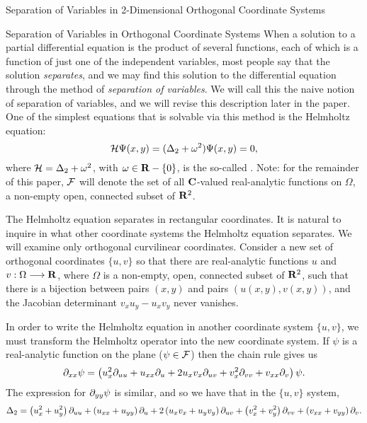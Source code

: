 \begin{center}
\LARGE Separation of Variables in 2-Dimensional Orthogonal Coordinate Systems \

\end{center}

\normalsize

\begin{section}{Separation of Variables in Orthogonal Coordinate Systems}
When a solution to a partial differential equation is the product of several functions, each of which is a function of just one of the independent variables, most people say that the solution \emph{separates}, and we may find this solution to the differential equation through the method of \emph{separation of variables}.  We will call this the naive notion of separation of variables, and we will revise this description later in the paper.  One of the simplest equations that is solvable via this method is the Helmholtz equation:
\begin{equation}
\label{helmholtz}
\mathcal{H} \Psi(x, y) = (\Delta_2 + \omega^2)\Psi(x, y) = 0,
\end{equation}
where $\mathcal{H} = \Delta_2 + \omega^2$, with $\omega \in \mathbf{R} - \{ 0 \}$, is the so-called .  Note: for the remainder of this paper, $\mathcal{F}$ will denote the set of all $\mathbf{C}$-valued real-analytic functions on $\Omega$, a non-empty open, connected subset of $\mathbf{R}^2$.

The Helmholtz equation separates in rectangular coordinates.  It is natural to inquire in what other coordinate systems the Helmholtz equation separates.  We will examine only orthogonal curvilinear coordinates.  Consider a new set of orthogonal coordinates $\{ u,v \}$ so that  there are real-analytic functions $u$ and $v: \Omega \longrightarrow \mathbf{R}$, where $\Omega$ is a non-empty, open, connected subset of $\mathbf{R}^2$, such that there is a bijection between pairs $(x,y)$ and pairs $(u(x,y), v(x,y))$, and  the Jacobian determinant $v_x u_y - u_x v_y$ never vanishes.

In order to write the Helmholtz equation in another coordinate system $\{ u, v \}$, we must transform the Helmholtz operator into the new coordinate system.  If $\psi$ is a real-analytic function on the plane ($\psi \in \mathcal{F}$) then the chain rule gives us
\[
\partial_{x x} \psi	=	\left( u_x^2 \partial_{u u} + u_{xx} \partial_{u} + 2 u_x v_x \partial_{u v} + v_x^2 \partial_{v v} + v_{xx} \partial_{v} \right) \psi .
\]
The expression for $\partial_{y y} \psi$ is similar, and so we have that in the $\{ u,v \}$ system,
\begin{equation}
\label{laplaciantrans}
\Delta_2 = \left( u_x^2 + u_y^2 \right) \partial_{u u} + \left( u_{xx} + u_{yy} \right) \partial_{u} + 2\left( u_x v_x + u_y v_y \right) \partial_{u v} + \left( v_x^2 + v_y^2 \right) \partial_{v v} + \left( v_{xx} + v_{yy} \right) \partial_{v} .
\end{equation}


\end{section}
